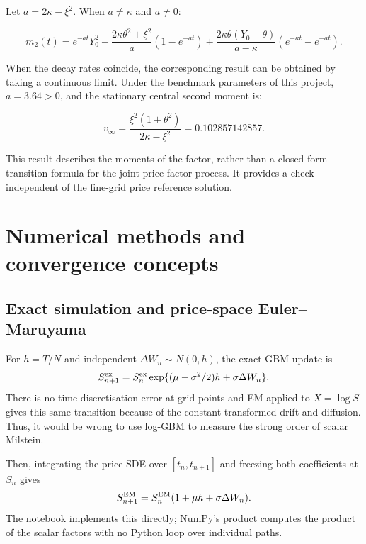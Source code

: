Let $a=2\kappa-\xi^2$. When $a\neq\kappa$ and $a\neq0$:

\begin{equation}
m_2(t)=e^{-at}Y_0^2+\frac{2\kappa\theta^2+\xi^2}{a}(1-e^{-at})+
\frac{2\kappa\theta(Y_0-\theta)}{a-\kappa}(e^{-\kappa t}-e^{-at}).
\end{equation}

When the decay rates coincide, the corresponding result can be obtained by taking a continuous limit. Under the benchmark parameters of this project, $a=3.64>0$, and the stationary central second moment is:

\begin{equation}\label{eq:vstar}
v_\infty=\frac{\xi^2(1+\theta^2)}{2\kappa-\xi^2}=0.102857142857.
\end{equation}

This result describes the moments of the factor, rather than a closed-form transition formula for the joint price-factor process. It provides a check independent of the fine-grid price reference solution.

\section{Numerical methods and convergence concepts}
\label{sec:methods}
\subsection{Exact simulation and price-space Euler--Maruyama}
For $h=T/N$ and independent $\Delta W_n\sim N(0,h)$, the exact GBM update is
\begin{equation}S_{n+1}^{\rm ex}=S_n^{\rm ex}\exp\{(\mu-\sigma^2/2)h+\sigma\Delta W_n\}.
\end{equation}
There is no time-discretisation error at grid points and EM applied to $X=\log S$ gives this same transition because of the constant transformed drift and diffusion. Thus, it would be wrong to use log-GBM to measure the strong order of scalar Milstein.

Then, integrating the price SDE over $[t_n,t_{n+1}]$ and freezing both coefficients at $S_n$ gives
\begin{equation}\label{eq:em}S_{n+1}^{\rm EM}=S_n^{\rm EM}(1+\mu h+\sigma\Delta W_n).
\end{equation}
The notebook implements this directly; NumPy's product computes the product of the scalar factors with no Python loop over individual paths.

